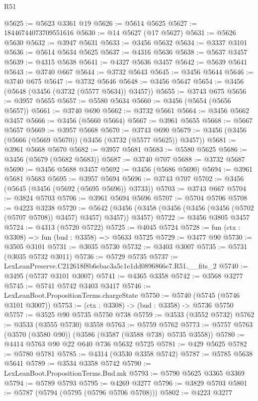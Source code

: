 \begin{lexlean}{R51}
\begin{coremodule}
@5625 := @5623 @3361 @19
@5626 := @5614 @5625
@5627 := 18446744073709551616
@5630 := @14 @5627 (@17 @5627)
@5631 := @5626 @5630
@5632 := @3947 @5631
@5633 := @3456 @5632
@5634 := @3337 @3101
@5636 := @5614 @5634 @5625
@5637 := @4316 @5636
@5638 := @5637 @3457
@5639 := @4315 @5638
@5641 := @4327 @5636 @3457
@5642 := @5639 @5641
@5643 := @3740 @667
@5644 := @3732 @5643
@5645 := @3456 @5644
@5646 := @3740 @675
@5647 := @3732 @5646
@5648 := @3456 @5647
@5654 := @3456 (@5648 (@3456 (@3732 (@5577 @5634)) @3457))
@5655 := @3743 @675
@5656 := @3957 @5655
@5657 := @5580 @5634
@5660 := @3456 (@5654 (@5656 @5657))
@5661 := @3740 @690
@5662 := @3732 @5661
@5664 := @3456 @5662 @3457
@5666 := @3456 (@5660 @5664)
@5667 := @3961 @5655
@5668 := @5667 @5657
@5669 := @3957 @5668
@5670 := @3743 @690
@5679 := @3456 (@3456 (@5666 (@5669 @5670)) (@3456 (@3732 (@5577 @5625)) @3457))
@5681 := @3961 @5668 @5670
@5682 := @3957 @5681
@5683 := @5580 @5625
@5686 := @3456 (@5679 (@5682 @5683))
@5687 := @3740 @707
@5688 := @3732 @5687
@5690 := @3456 @5688 @3457
@5692 := @3456 (@5686 @5690)
@5694 := @3961 @5681 @5683
@5695 := @3957 @5694
@5696 := @3743 @707
@5702 := @3456 (@5645 (@3456 (@5692 (@5695 @5696)) @3733))
@5703 := @3743 @667
@5704 := @3824 @5703
@5706 := @3961 @5694 @5696
@5707 := @5704 @5706
@5708 := @4223 @3238
@5720 := @5642 (@3456 (@3458 (@3456 (@3456 (@3456 (@5702 (@5707 @5708)) @3457) @3457) @3457)) @3457)
@5722 := @3456 @3805 @3457
@5724 := @4313 (@5720 @5722)
@5725 := @4045 @5724
@5728 := fun (ctx : @3308) => fun (bud : @3358) => @5633 @5725
@5729 := @3477 @90
@5730 := @3505 @3101
@5731 := @3035 @5730
@5732 := @3403 @3007
@5735 := @5731 (@3035 @5732 @3011)
@5736 := @5729 @5735
@5737 := LexLeanPreserve.C212618f8b6ebac3a5c1e1dd0896866e7.R51.__fits_2
@5740 := @3495 (@5737 @3101 @3007)
@5741 := @4365 @3358
@5742 := @3568 @3277
@5745 := @5741 @5742 @3403 @3417
@5746 := LexLeanBoot.PropositionTerms.chargeState
@5750 := @5740 (@5745 (@5746 @3101 @3007))
@5753 := (ctx : @3308) -> (bud : @3358) -> @5736 @5750
@5757 := @3525 @90 @5735 @5750 @738
@5759 := @3533 (@3552 @5732)
@5762 := @3533 (@3555 @5730) @3558
@5763 := @5759 @5762
@5773 := @5757 @5763 (@3570 (@3580 @90)) (@3586 (@3587 (@3588 @738) @5735 @3558))
@5780 := @4414 @5763 @90 @22 @640 @736 @5632 @5725
@5781 := @429 @5625
@5782 := @5780 @5781
@5785 := @4314 (@3530 @3358 @5742)
@5787 := @5785 @5638 @5641
@5789 := @3534 @3358 @5742
@5790 := LexLeanBoot.PropositionTerms.Bud.mk
@5793 := @5790 @5625 @3365 @3369
@5794 := @5789 @5793
@5795 := @4269 @3277
@5796 := @3829 @5703
@5801 := @5787 (@5794 (@5795 (@5796 @5706 @5708)))
@5802 := @4223 @3277

\end{coremodule}
\end{lexlean}
